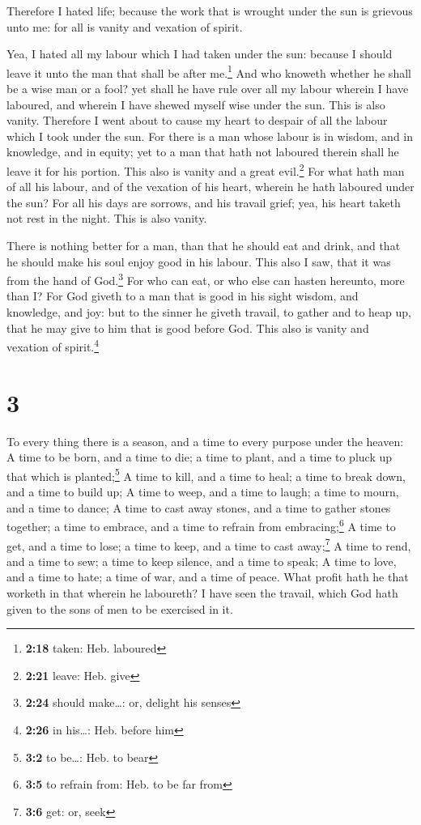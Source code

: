  Therefore I hated life; because the work that is wrought
under the sun is grievous unto me: for all is vanity and vexation of
spirit.

 Yea, I hated all my labour which I had taken under the
sun: because I should leave it unto the man that shall be after
me.\footnote{\textbf{2:18} taken: Heb. laboured}  And who
knoweth whether he shall be a wise man or a fool? yet shall he have rule
over all my labour wherein I have laboured, and wherein I have shewed
myself wise under the sun. This is also vanity. 
Therefore I went about to cause my heart to despair of all the labour
which I took under the sun.  For there is a man whose
labour is in wisdom, and in knowledge, and in equity; yet to a man that
hath not laboured therein shall he leave it for his portion. This also
is vanity and a great evil.\footnote{\textbf{2:21} leave: Heb. give}
 For what hath man of all his labour, and of the vexation
of his heart, wherein he hath laboured under the sun? 
For all his days are sorrows, and his travail grief; yea, his heart
taketh not rest in the night. This is also vanity.

 There is nothing better for a man, than that he should
eat and drink, and that he should make his soul enjoy good in his
labour. This also I saw, that it was from the hand of God.\footnote{\textbf{2:24}
  should make\ldots: or, delight his senses}  For who can
eat, or who else can hasten hereunto, more than I?  For
God giveth to a man that is good in his sight wisdom, and knowledge, and
joy: but to the sinner he giveth travail, to gather and to heap up, that
he may give to him that is good before God. This also is vanity and
vexation of spirit.\footnote{\textbf{2:26} in his\ldots: Heb. before him}

\hypertarget{section-2}{%
\section{3}\label{section-2}}

 To every thing there is a season, and a time to every
purpose under the heaven:  A time to be born, and a time
to die; a time to plant, and a time to pluck up that which is
planted;\footnote{\textbf{3:2} to be\ldots: Heb. to bear} 
A time to kill, and a time to heal; a time to break down, and a time to
build up;  A time to weep, and a time to laugh; a time to
mourn, and a time to dance;  A time to cast away stones,
and a time to gather stones together; a time to embrace, and a time to
refrain from embracing;\footnote{\textbf{3:5} to refrain from: Heb. to
  be far from}  A time to get, and a time to lose; a time
to keep, and a time to cast away;\footnote{\textbf{3:6} get: or, seek}
 A time to rend, and a time to sew; a time to keep
silence, and a time to speak;  A time to love, and a time
to hate; a time of war, and a time of peace.  What profit
hath he that worketh in that wherein he laboureth?  I
have seen the travail, which God hath given to the sons of men to be
exercised in it.

